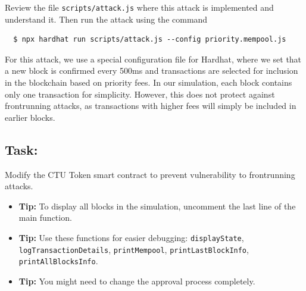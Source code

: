 \documentclass[12pt]{article}
\begin{document}
\medskip
\noindent
Review the file \texttt{scripts/attack.js} where this attack is implemented and understand it. Then run the attack using the command

\begin{verbatim}
  $ npx hardhat run scripts/attack.js --config priority.mempool.js
\end{verbatim}

For this attack, we use a special configuration file for Hardhat, where we set that a new block is confirmed every 500ms and transactions are selected for inclusion in the blockchain based on priority fees. In our simulation, each block contains only one transaction for simplicity. However, this does not protect against frontrunning attacks, as transactions with higher fees will simply be included in earlier blocks. 

\subsection*{Task:} Modify the CTU Token smart contract to prevent vulnerability to frontrunning attacks.

\begin{itemize}
  \item \textbf{Tip:} To display all blocks in the simulation, uncomment the last line of the main function.
  \item \textbf{Tip:} Use these functions for easier debugging: \texttt{displayState}, 
  \texttt{logTransactionDetails}, \texttt{printMempool}, \texttt{printLastBlockInfo}, \texttt{printAllBlocksInfo}.
  \item \textbf{Tip:} You might need to change the approval process completely.
\end{itemize}
\end{document}

